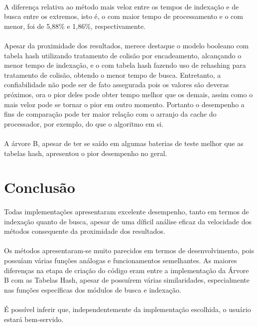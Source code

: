 \documentclass[12pt,a4paper]{article}
\begin{document}
{\paragraph{} A diferença relativa ao método mais veloz entre os tempos de indexação e de busca entre os extremos, isto é, o com maior tempo de processamento e o com menor, foi de 5,88\% e 1,86\%, respectivamente. }

{\paragraph{} Apesar da proximidade dos resultados, merece destaque o modelo booleano com tabela hash utilizando tratamento de colisão por encadeamento, alcançando o menor tempo de indexação, e o com tabela hash fazendo uso de rehashing para tratamento de colisão, obtendo o menor tempo de busca. Entretanto, a confiabilidade não pode ser de fato assegurada pois os valores são deveras próximos, ora o pior deles pode obter tempo melhor que os demais, assim como o mais veloz pode se tornar o pior em outro momento. Portanto o desempenho a fins de comparação pode ter maior relação com o arranjo da cache do processador, por exemplo, do que o algoritmo em si.}

{\paragraph{} A árvore B, apesar de ter se saído em algumas baterias de teste melhor que as tabelas hash, apresentou o pior desempenho no geral.}

  
 \newpage
 \section{Conclusão}
  {\paragraph{} Todas implementações apresentaram excelente desempenho, tanto em termos de indexação quanto de busca, apesar de uma díficil análise eficaz da velocidade dos métodos consequente da proximidade dos resultados. }
   {\paragraph{} Os métodos apresentaram-se muito parecidos em termos de desenvolvimento, pois possuíam várias funções análogas e funcionamentos semelhantes. As maiores diferenças na etapa de criação do código eram entre a implementação da Árvore B com as Tabelas Hash, apesar de possuírem várias similaridades, especialmente nas funções específicas dos módulos de busca e indexação. }
  {\paragraph{} É possível inferir que, independentemente da implementação escolhida, o usuário estará bem-servido. }
 
\end{document}
